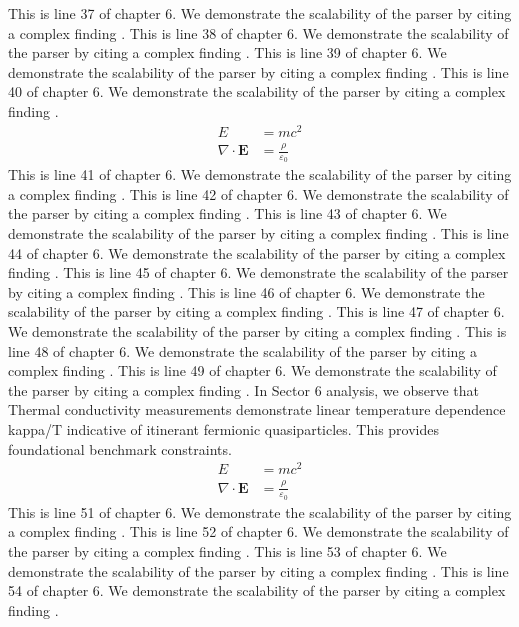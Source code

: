This is line 37 of chapter 6. We demonstrate the scalability of the parser by citing a complex finding \cite{ref6_37}.
This is line 38 of chapter 6. We demonstrate the scalability of the parser by citing a complex finding \cite{ref6_38}.
This is line 39 of chapter 6. We demonstrate the scalability of the parser by citing a complex finding \cite{ref6_39}.
This is line 40 of chapter 6. We demonstrate the scalability of the parser by citing a complex finding \cite{ref6_40}.
\begin{align*}
  E &= mc^2 \\
  \nabla \cdot \mathbf{E} &= \frac{\rho}{\varepsilon_0}
\end{align*}
This is line 41 of chapter 6. We demonstrate the scalability of the parser by citing a complex finding \cite{ref6_41}.
This is line 42 of chapter 6. We demonstrate the scalability of the parser by citing a complex finding \cite{ref6_42}.
This is line 43 of chapter 6. We demonstrate the scalability of the parser by citing a complex finding \cite{ref6_43}.
This is line 44 of chapter 6. We demonstrate the scalability of the parser by citing a complex finding \cite{ref6_44}.
This is line 45 of chapter 6. We demonstrate the scalability of the parser by citing a complex finding \cite{ref6_45}.
This is line 46 of chapter 6. We demonstrate the scalability of the parser by citing a complex finding \cite{ref6_46}.
This is line 47 of chapter 6. We demonstrate the scalability of the parser by citing a complex finding \cite{ref6_47}.
This is line 48 of chapter 6. We demonstrate the scalability of the parser by citing a complex finding \cite{ref6_48}.
This is line 49 of chapter 6. We demonstrate the scalability of the parser by citing a complex finding \cite{ref6_49}.
In Sector 6 analysis, we observe that Thermal conductivity measurements demonstrate linear temperature dependence kappa/T indicative of itinerant fermionic quasiparticles. This provides foundational benchmark constraints.
\begin{align*}
  E &= mc^2 \\
  \nabla \cdot \mathbf{E} &= \frac{\rho}{\varepsilon_0}
\end{align*}
This is line 51 of chapter 6. We demonstrate the scalability of the parser by citing a complex finding \cite{ref6_51}.
This is line 52 of chapter 6. We demonstrate the scalability of the parser by citing a complex finding \cite{ref6_52}.
This is line 53 of chapter 6. We demonstrate the scalability of the parser by citing a complex finding \cite{ref6_53}.
This is line 54 of chapter 6. We demonstrate the scalability of the parser by citing a complex finding \cite{ref6_54}.
